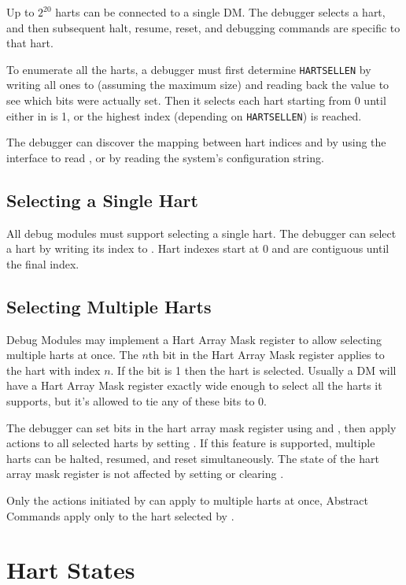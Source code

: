 Up to $2^{20}$ harts can be connected to a single DM. The debugger
selects a hart, and then subsequent halt, resume, reset, and debugging
commands are specific to that hart.

To enumerate all the harts, a debugger must first determine {\tt HARTSELLEN}
by writing  all ones to \Fhartsel (assuming the maximum size) and reading back
the value to see which bits were actually set.  Then it selects each hart
starting from 0 until either \Fanynonexistent in \Rdmstatus is 1, or the
highest index (depending on {\tt HARTSELLEN}) is reached.

The debugger can discover the mapping between hart indices and
\Rmhartid by using the interface to read \Rmhartid, or by
reading the system's configuration string.

\subsection {Selecting a Single Hart}

All debug modules must support selecting a single hart.
The debugger can select a hart by writing its index to \Fhartsel.
Hart indexes start at 0 and are contiguous until the final index.

\subsection {Selecting Multiple Harts} \label{hartarraymask}

Debug Modules may implement a Hart Array Mask register to allow selecting
multiple harts at once. The $n$th bit in the Hart Array Mask register applies to
the hart with index $n$. If the bit is 1 then the hart is selected.  Usually a DM
will have a Hart Array Mask register exactly wide enough to select all the
harts it supports, but it's allowed to tie any of these bits to 0.

The debugger can set bits in the hart array mask register using \Rhawindowsel
and \Rhawindow, then apply actions to all selected harts by setting \Fhasel. If
this feature is supported, multiple harts can be halted, resumed, and reset
simultaneously. The state of the hart array mask register is not affected by
setting or clearing \Fhasel.

Only the actions initiated by \Rdmcontrol can apply to multiple harts
at once, Abstract Commands apply only to the hart selected by
\Fhartsel.

\section{Hart States}

